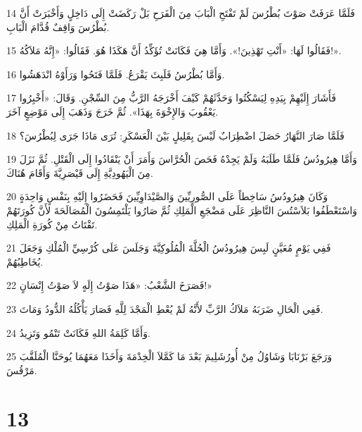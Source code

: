 \par 14 فَلَمَّا عَرَفَتْ صَوْتَ بُطْرُسَ لَمْ تَفْتَحِ الْبَابَ مِنَ الْفَرَحِ بَلْ رَكَضَتْ إِلَى دَاخِلٍ وَأَخْبَرَتْ أَنَّ بُطْرُسَ وَاقِفٌ قُدَّامَ الْبَابِ.
\par 15 فَقَالُوا لَهَا: «أَنْتِ تَهْذِينَ!». وَأَمَّا هِيَ فَكَانَتْ تُؤَكِّدُ أَنَّ هَكَذَا هُوَ. فَقَالُوا: «إِنَّهُ مَلاَكُهُ!».
\par 16 وَأَمَّا بُطْرُسُ فَلَبِثَ يَقْرَعُ. فَلَمَّا فَتَحُوا وَرَأَوْهُ انْدَهَشُوا.
\par 17 فَأَشَارَ إِلَيْهِمْ بِيَدِهِ لِيَسْكُتُوا وَحَدَّثَهُمْ كَيْفَ أَخْرَجَهُ الرَّبُّ مِنَ السِّجْنِ. وَقَالَ: «أَخْبِرُوا يَعْقُوبَ وَالإِخْوَةَ بِهَذَا». ثُمَّ خَرَجَ وَذَهَبَ إِلَى مَوْضِعٍ آخَرَ.
\par 18 فَلَمَّا صَارَ النَّهَارُ حَصَلَ اضْطِرَابٌ لَيْسَ بِقَلِيلٍ بَيْنَ الْعَسْكَرِ: تُرَى مَاذَا جَرَى لِبُطْرُسَ؟
\par 19 وَأَمَّا هِيرُودُسُ فَلَمَّا طَلَبَهُ وَلَمْ يَجِدْهُ فَحَصَ الْحُرَّاسَ وَأَمَرَ أَنْ يَنْقَادُوا إِلَى الْقَتْلِ. ثُمَّ نَزَلَ مِنَ الْيَهُودِيَّةِ إِلَى قَيْصَرِيَّةَ وَأَقَامَ هُنَاكَ.
\par 20 وَكَانَ هِيرُودُسُ سَاخِطاً عَلَى الصُّورِيِّينَ وَالصَّيْدَاوِيِّينَ فَحَضَرُوا إِلَيْهِ بِنَفْسٍ وَاحِدَةٍ وَاسْتَعْطَفُوا بَلاَسْتُسَ النَّاظِرَ عَلَى مَضْجَعِ الْمَلِكِ ثُمَّ صَارُوا يَلْتَمِسُونَ الْمُصَالَحَةَ لأَنَّ كُورَتَهُمْ تَقْتَاتُ مِنْ كُورَةِ الْمَلِكِ.
\par 21 فَفِي يَوْمٍ مُعَيَّنٍ لَبِسَ هِيرُودُسُ الْحُلَّةَ الْمُلُوكِيَّةَ وَجَلَسَ عَلَى كُرْسِيِّ الْمُلْكِ وَجَعَلَ يُخَاطِبُهُمْ.
\par 22 فَصَرَخَ الشَّعْبُ: «هَذَا صَوْتُ إِلَهٍ لاَ صَوْتُ إِنْسَانٍ!»
\par 23 فَفِي الْحَالِ ضَرَبَهُ مَلاَكُ الرَّبِّ لأَنَّهُ لَمْ يُعْطِ الْمَجْدَ لِلَّهِ فَصَارَ يَأْكُلُهُ الدُّودُ وَمَاتَ.
\par 24 وَأَمَّا كَلِمَةُ اللهِ فَكَانَتْ تَنْمُو وَتَزِيدُ.
\par 25 وَرَجَعَ بَرْنَابَا وَشَاوُلُ مِنْ أُورُشَلِيمَ بَعْدَ مَا كَمَّلاَ الْخِدْمَةَ وَأَخَذَا مَعَهُمَا يُوحَنَّا الْمُلَقَّبَ مَرْقُسَ.

\chapter{13}

